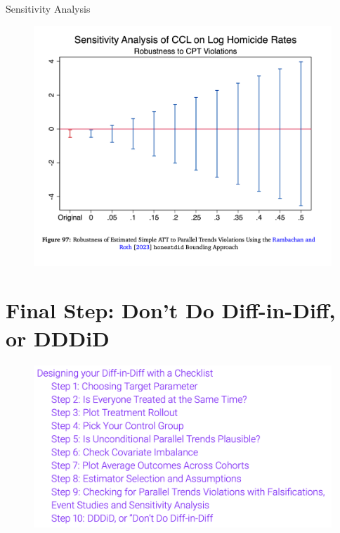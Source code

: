 \documentclass{beamer}
\begin{document}
\begin{frame}{Sensitivity Analysis}

	\begin{figure}
    \includegraphics[height=0.85\textheight]{./lecture_includes/step9_roth}
	\end{figure}

\end{frame}








\section{Final Step: Don't Do Diff-in-Diff, or DDDiD}

\begin{frame}

\begin{figure}
    \centering
    \includegraphics[width=\textwidth]{./lecture_includes/checklist}
\end{figure}

\end{frame}
\end{document}
